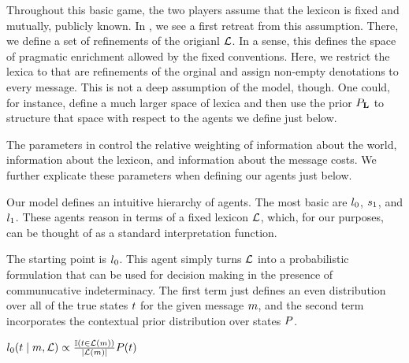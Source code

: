 \documentclass{article}
\begin{document}
Throughout this basic game, the two players assume that the lexicon is
fixed and mutually, publicly known. In , we see a
first retreat from this assumption. There, we define a set of
refinements of the origianl $\mathcal{L}$. In a sense, this defines the space
of pragmatic enrichment allowed by the fixed conventions. Here, we
restrict the lexica to that are refinements of the orginal and assign
non-empty denotations to every message. This is not a deep assumption
of the model, though. One could, for instance, define a much larger
space of lexica and then use the prior $P_{\mathbf{L}}$ to structure
that space with respect to the agents we define just below.

The parameters in  control the relative weighting
of information about the world, information about the lexicon, and
information about the message costs. We further explicate these
parameters when defining our agents just below.


Our model defines an intuitive hierarchy of agents. The most basic are
$l_{0}$, $s_{1}$, and $l_{1}$. These agents
reason in terms of a fixed lexicon $\mathcal{L}$, which, for our purposes,
can be thought of as a standard interpretation function. 

The starting point is $l_{0}$. This agent simply turns $\mathcal{L}$
into a probabilistic formulation that can be used for decision making
in the presence of communucative indeterminacy. The first term just
defines an even distribution over all of the true states $t$ for
the given message $m$, and the second term incorporates the
contextual prior distribution over states $P$.

\begin{examples}
\item\label{l0}%
    $l_{0}(t \mid m, \mathcal{L}) \propto
    \frac{\mathbb{I}(t \in \mathcal{L}(m))}{|\mathcal{L}(m)|}
    P(t)$
\end{examples}
\end{document}
